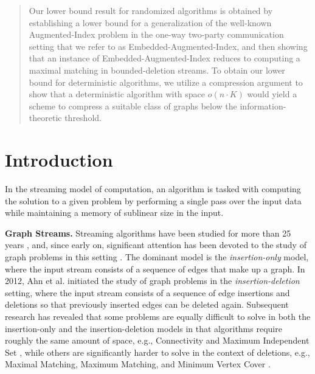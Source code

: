 \documentclass[11pt,a4paper]{article}
\begin{document}
\begin{abstract}
\smallskip

Our lower bound result for randomized algorithms is obtained by establishing a lower bound for a generalization of the well-known \textsf{Augmented-Index} problem in the one-way two-party communication setting that we refer to as \textsf{Embedded-Augmented-Index}, and then showing that an instance of \textsf{Embedded-Augmented-Index} reduces to computing a maximal matching in bounded-deletion streams. To obtain our lower bound for deterministic algorithms, we utilize a compression argument to show that a deterministic algorithm with space $o(n \cdot K)$ would yield a scheme to compress a suitable class of graphs below the information-theoretic threshold.
\end{abstract}

\clearpage
{} 

\newpage

\section{Introduction}
In the streaming model of computation, an algorithm is tasked with computing the solution to a given problem by performing a single pass over the input data while maintaining a memory of sublinear size in the input. 

\smallskip
\noindent \textbf{Graph Streams.} Streaming algorithms have been studied for more than 25 years \cite{ams96}, and, since early on, significant attention has been devoted to the study of graph problems in this setting \cite{hrr98,fkmsz04}. The dominant model is the {\em insertion-only} model, where the input stream consists of a sequence of edges that make up a graph. In 2012, Ahn et al. \cite{agm12} initiated the study of graph problems in the {\em insertion-deletion} setting, where the input stream consists of a sequence of edge insertions and deletions so that previously inserted edges can be deleted again. Subsequent research has revealed that some problems are equally difficult to solve in both the insertion-only and the insertion-deletion models in that algorithms require roughly the same amount of space, e.g., \textsf{Connectivity} \cite{agm12} and \textsf{Maximum Independent Set} \cite{hssw12}, while others are significantly harder to solve in the context of deletions, e.g., \textsf{Maximal Matching},   \textsf{Maximum Matching}, and \textsf{Minimum Vertex Cover} \cite{akl16,dk20}.
\end{document}
